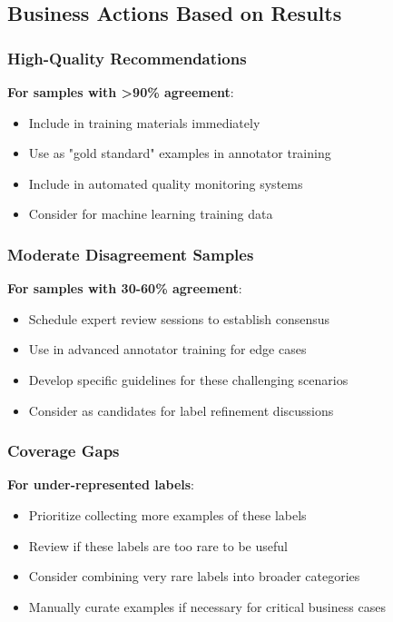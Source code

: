 \documentclass[11pt]{article}
\begin{document}
\subsection{Business Actions Based on Results}

\subsubsection{High-Quality Recommendations}
\textbf{For samples with >90\% agreement}:
\begin{itemize}
\item Include in training materials immediately
\item Use as "gold standard" examples in annotator training
\item Include in automated quality monitoring systems
\item Consider for machine learning training data
\end{itemize}

\subsubsection{Moderate Disagreement Samples}
\textbf{For samples with 30-60\% agreement}:
\begin{itemize}
\item Schedule expert review sessions to establish consensus
\item Use in advanced annotator training for edge cases
\item Develop specific guidelines for these challenging scenarios
\item Consider as candidates for label refinement discussions
\end{itemize}

\subsubsection{Coverage Gaps}
\textbf{For under-represented labels}:
\begin{itemize}
\item Prioritize collecting more examples of these labels
\item Review if these labels are too rare to be useful
\item Consider combining very rare labels into broader categories
\item Manually curate examples if necessary for critical business cases
\end{itemize}
\end{document}
